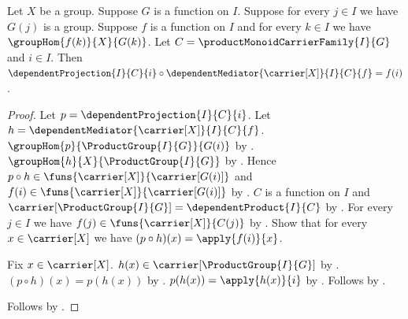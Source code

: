 \begin{theorem}\label{product_group_mediator_factorization}
    Let $X$ be a group.
    Suppose $G$ is a function on $I$.
    Suppose for every $j\in I$ we have $G(j)$ is a group.
    Suppose $f$ is a function on $I$ and for every $k\in I$ we have
        $\groupHom{f(k)}{X}{G(k)}$.
    Let $C=\productMonoidCarrierFamily{I}{G}$ and $i\in I$.
    Then
        $\dependentProjection{I}{C}{i}\circ
            \dependentMediator{\carrier[X]}{I}{C}{f}=f(i)$.
\end{theorem}
\begin{proof}
    Let $p=\dependentProjection{I}{C}{i}$.
    Let $h=\dependentMediator{\carrier[X]}{I}{C}{f}$.
    $\groupHom{p}{\ProductGroup{I}{G}}{G(i)}$ by
        .
    $\groupHom{h}{X}{\ProductGroup{I}{G}}$ by
        .
    Hence $p\circ h\in\funs{\carrier[X]}{\carrier[G(i)]}$ and
        $f(i)\in\funs{\carrier[X]}{\carrier[G(i)]}$ by
        .
    $C$ is a function on $I$ and
        $\carrier[\ProductGroup{I}{G}]=\dependentProduct{I}{C}$ by
        .
    For every $j\in I$ we have
        $f(j)\in\funs{\carrier[X]}{C(j)}$ by
        .
    Show that for every $x\in\carrier[X]$ we have
        $(p\circ h)(x)=\apply{f(i)}{x}$.
    \begin{subproof}
        Fix $x\in\carrier[X]$.
        $h(x)\in\carrier[\ProductGroup{I}{G}]$ by
            .
        $(p\circ h)(x)=p(h(x))$ by
            .
        $p(h(x))=\apply{h(x)}{i}$ by
            .
        Follows by .
    \end{subproof}
    Follows by .
\end{proof}

